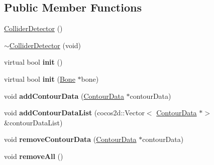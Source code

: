 \subsection*{Public Member Functions}
\begin{DoxyCompactItemize}
\item 
\hyperlink{classcocostudio_1_1ColliderDetector_a16246a3f3f63c87d52b7438443f2e3e4}{Collider\+Detector} ()
\item 
\hyperlink{classcocostudio_1_1ColliderDetector_aff99ff5032b1f076b87c458cf2027908}{$\sim$\+Collider\+Detector} (void)
\item 
\mbox{\label{classcocostudio_1_1ColliderDetector_acf75bf4aa04ab69a12062815ec83c111}} 
virtual bool {\bfseries init} ()
\item 
\mbox{\label{classcocostudio_1_1ColliderDetector_a6eb5526a8fbe88d6fb74f1c1e0c1ed65}} 
virtual bool {\bfseries init} (\hyperlink{classcocostudio_1_1Bone}{Bone} $\ast$bone)
\item 
\mbox{\label{classcocostudio_1_1ColliderDetector_a6ca43d2b45db424fe88afcc2d217731e}} 
void {\bfseries add\+Contour\+Data} (\hyperlink{classcocostudio_1_1ContourData}{Contour\+Data} $\ast$contour\+Data)
\item 
\mbox{\label{classcocostudio_1_1ColliderDetector_aee7ac9878f241135389daae630f660db}} 
void {\bfseries add\+Contour\+Data\+List} (cocos2d\+::\+Vector$<$ \hyperlink{classcocostudio_1_1ContourData}{Contour\+Data} $\ast$$>$ \&contour\+Data\+List)
\item 
\mbox{\label{classcocostudio_1_1ColliderDetector_a4d47a9629ce231281bd500024ce14e61}} 
void {\bfseries remove\+Contour\+Data} (\hyperlink{classcocostudio_1_1ContourData}{Contour\+Data} $\ast$contour\+Data)
\item 
\mbox{\label{classcocostudio_1_1ColliderDetector_a8058c4a96590eab7fde645d13e524cb9}} 
void {\bfseries remove\+All} ()
\item 
\mbox{\label{classcocostudio_1_1ColliderDetector_a6954df53b8c501cee85c49ac3c6d21af}} 
$$
\end{DoxyCompactItemize}
